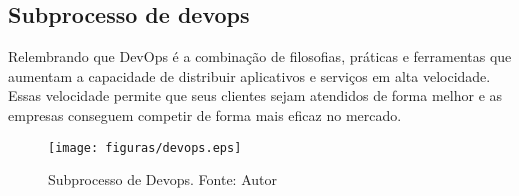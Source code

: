 \subsection{Subprocesso de devops}

Relembrando que DevOps é a combinação de filosofias, práticas e ferramentas que aumentam a capacidade de distribuir aplicativos e serviços em alta velocidade. Essas velocidade permite que seus clientes sejam atendidos de forma melhor e as empresas conseguem competir de forma mais eficaz no mercado.

\begin{figure}[H]
	\centering
  \texttt{[image: figuras/devops.eps]}
  \caption[Subprocesso de Devops.]{Subprocesso de Devops. Fonte: Autor}
	\label{fig:devops}
\end{figure}

